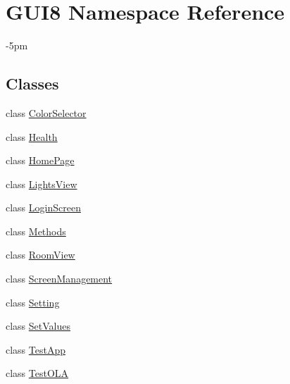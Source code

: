 \hypertarget{namespaceGUI8}{}\section{G\+U\+I8 Namespace Reference}
\label{namespaceGUI8}


-\/5pm  


\subsection*{Classes}
\begin{DoxyCompactItemize}
\item 
class \hyperlink{classGUI8_1_1ColorSelector}{Color\+Selector}
\item 
class \hyperlink{classGUI8_1_1Health}{Health}
\item 
class \hyperlink{classGUI8_1_1HomePage}{Home\+Page}
\item 
class \hyperlink{classGUI8_1_1LightsView}{Lights\+View}
\item 
class \hyperlink{classGUI8_1_1LoginScreen}{Login\+Screen}
\item 
class \hyperlink{classGUI8_1_1Methods}{Methods}
\item 
class \hyperlink{classGUI8_1_1RoomView}{Room\+View}
\item 
class \hyperlink{classGUI8_1_1ScreenManagement}{Screen\+Management}
\item 
class \hyperlink{classGUI8_1_1Setting}{Setting}
\item 
class \hyperlink{classGUI8_1_1SetValues}{Set\+Values}
\item 
class \hyperlink{classGUI8_1_1TestApp}{Test\+App}
\item 
class \hyperlink{classGUI8_1_1TestOLA}{Test\+O\+LA}
\end{DoxyCompactItemize}

